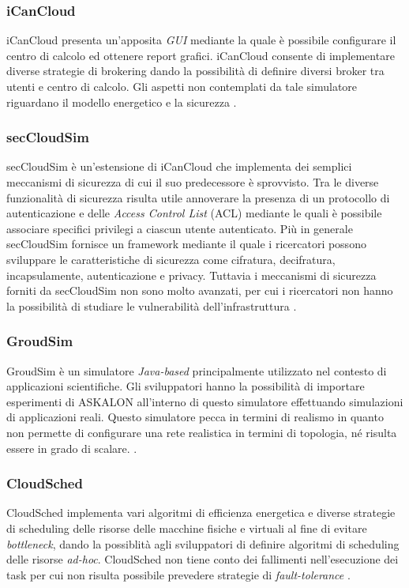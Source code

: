 {\subsubsection*{iCanCloud}
iCanCloud \cite{nunez2012icancloud} presenta un'apposita \emph{GUI} mediante la quale è possibile configurare il centro di calcolo ed ottenere report grafici. iCanCloud consente di implementare diverse strategie di brokering dando la possibilità di definire diversi broker tra utenti e centro di calcolo. Gli aspetti non contemplati da tale simulatore riguardano il modello energetico e la sicurezza \cite{mansouri2020cloud}. 
\subsubsection*{secCloudSim}
secCloudSim \cite{rehman2014seccloudsim} è un'estensione di iCanCloud che implementa dei semplici meccanismi di sicurezza di cui il suo predecessore è sprovvisto. Tra le diverse funzionalità di sicurezza risulta utile annoverare la presenza di un protocollo di autenticazione e delle \emph{Access Control List} (ACL) mediante le quali è possibile associare specifici privilegi a ciascun utente autenticato. Più in generale secCloudSim fornisce un framework mediante il quale i ricercatori possono sviluppare le caratteristiche di sicurezza come cifratura, decifratura, incapsulamente, autenticazione e privacy. Tuttavia i meccanismi di sicurezza forniti da secCloudSim non sono molto avanzati, per cui i ricercatori non hanno la possibilità di studiare le vulnerabilità dell'infrastruttura \cite{mansouri2020cloud}. 
\subsubsection*{GroudSim}
GroudSim \cite{ostermann2011groudsim} è un simulatore \emph{Java-based} principalmente utilizzato nel contesto di applicazioni scientifiche. Gli sviluppatori hanno la possibilità di importare esperimenti di ASKALON \cite{fahringer2005askalon} all'interno di questo simulatore effettuando simulazioni di applicazioni reali. Questo simulatore pecca in termini di realismo in quanto non permette di configurare una rete realistica in termini di topologia, né risulta essere in grado di scalare. \cite{mansouri2020cloud}.
\subsubsection*{CloudSched}
CloudSched \cite{tian2013toolkit} implementa vari algoritmi di efficienza energetica e diverse strategie di scheduling delle risorse delle macchine fisiche e virtuali al fine di evitare \emph{bottleneck}, dando la possiblità agli sviluppatori di definire algoritmi di scheduling delle risorse \emph{ad-hoc}. CloudSched non tiene conto dei fallimenti nell'esecuzione dei task per cui non risulta possibile prevedere strategie di \emph{fault-tolerance} \cite{mansouri2020cloud}.
}
